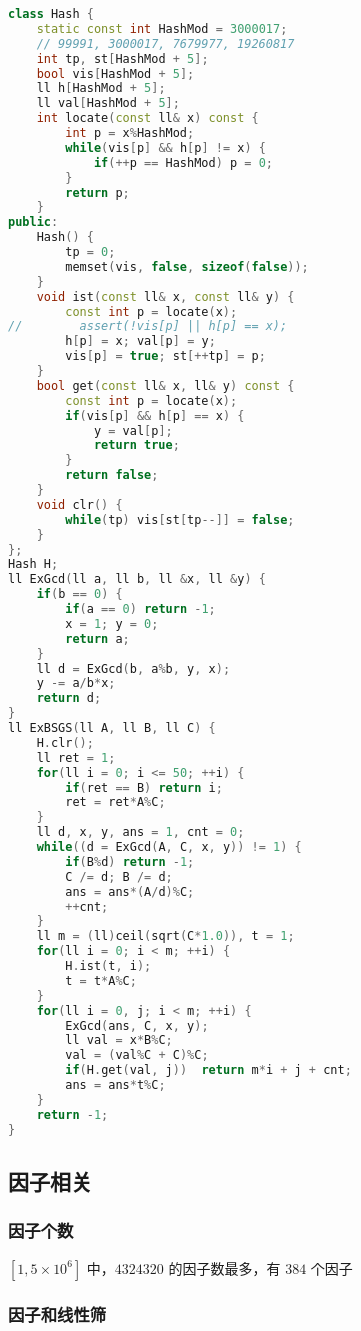 \begin{lstlisting}[language=C++]
class Hash {
    static const int HashMod = 3000017;
    // 99991, 3000017, 7679977, 19260817
    int tp, st[HashMod + 5];
    bool vis[HashMod + 5];
    ll h[HashMod + 5];
    ll val[HashMod + 5];
    int locate(const ll& x) const {
        int p = x%HashMod;
        while(vis[p] && h[p] != x) {
            if(++p == HashMod) p = 0;
        }
        return p;
    }
public:
    Hash() {
        tp = 0;
        memset(vis, false, sizeof(false));
    }
    void ist(const ll& x, const ll& y) {
        const int p = locate(x);
//        assert(!vis[p] || h[p] == x);
        h[p] = x; val[p] = y;
        vis[p] = true; st[++tp] = p;
    }
    bool get(const ll& x, ll& y) const {
        const int p = locate(x);
        if(vis[p] && h[p] == x) {
            y = val[p];
            return true;
        }
        return false;
    }
    void clr() {
        while(tp) vis[st[tp--]] = false;
    }
};
Hash H;
ll ExGcd(ll a, ll b, ll &x, ll &y) {
    if(b == 0) {
        if(a == 0) return -1;
        x = 1; y = 0;
        return a;
    }
    ll d = ExGcd(b, a%b, y, x);
    y -= a/b*x;
    return d;
}
ll ExBSGS(ll A, ll B, ll C) {
    H.clr();
    ll ret = 1;
    for(ll i = 0; i <= 50; ++i) {
        if(ret == B) return i;
        ret = ret*A%C;
    }
    ll d, x, y, ans = 1, cnt = 0;
    while((d = ExGcd(A, C, x, y)) != 1) {
        if(B%d) return -1;
        C /= d; B /= d;
        ans = ans*(A/d)%C;
        ++cnt;
    }
    ll m = (ll)ceil(sqrt(C*1.0)), t = 1;
    for(ll i = 0; i < m; ++i) {
        H.ist(t, i);
        t = t*A%C;
    }
    for(ll i = 0, j; i < m; ++i) {
        ExGcd(ans, C, x, y);
        ll val = x*B%C;
        val = (val%C + C)%C;
        if(H.get(val, j))  return m*i + j + cnt;
        ans = ans*t%C;
    }
    return -1;
}
\end{lstlisting}

\subsection{因子相关}

\subsubsection{因子个数}

$[1, 5 \times 10^6]$ 中，$4324320$ 的因子数最多，有 $384$ 个因子

\subsubsection{因子和线性筛}

